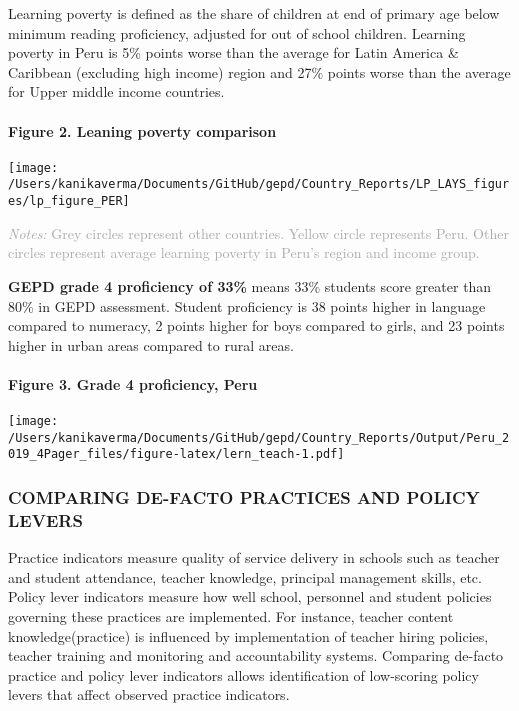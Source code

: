 \documentclass[
  twocolumn]{article}
\begin{document}
Learning poverty is defined as the share of children at end of primary
age below minimum reading proficiency, adjusted for out of school
children. Learning poverty in Peru is 5\% points worse than the average
for Latin America \& Caribbean (excluding high income) region and 27\%
points worse than the average for Upper middle income countries.

\hypertarget{figure-2.-leaning-poverty-comparison}{%
\paragraph{Figure 2. Leaning poverty
comparison}\label{figure-2.-leaning-poverty-comparison}}

\texttt{[image: /Users/kanikaverma/Documents/GitHub/gepd/Country\_Reports/LP\_LAYS\_figures/lp\_figure\_PER]}

{\scriptsize
    \textcolor{darkgray}{\textit{Notes:} Grey circles represent other countries. Yellow circle represents Peru. Other circles represent average learning poverty in Peru's region and income group.}
  }

\textbf{GEPD grade 4 proficiency of 33\%} means 33\% students score
greater than 80\% in GEPD assessment. Student proficiency is 38 points
higher in language compared to numeracy, 2 points higher for boys
compared to girls, and 23 points higher in urban areas compared to rural
areas. \vfill\null

\hypertarget{figure-3.-grade-4-proficiency-peru}{%
\paragraph{Figure 3. Grade 4 proficiency,
Peru}\label{figure-3.-grade-4-proficiency-peru}}

\texttt{[image: /Users/kanikaverma/Documents/GitHub/gepd/Country\_Reports/Output/Peru\_2019\_4Pager\_files/figure-latex/lern\_teach-1.pdf]}

\hypertarget{comparing-de-facto-practices-and-policy-levers}{%
\subsubsection{\texorpdfstring{\textbf{COMPARING DE-FACTO PRACTICES AND
POLICY
LEVERS}}{COMPARING DE-FACTO PRACTICES AND POLICY LEVERS}}\label{comparing-de-facto-practices-and-policy-levers}}

Practice indicators measure quality of service delivery in schools such
as teacher and student attendance, teacher knowledge, principal
management skills, etc. Policy lever indicators measure how well school,
personnel and student policies governing these practices are
implemented. For instance, teacher content knowledge(practice) is
influenced by implementation of teacher hiring policies, teacher
training and monitoring and accountability systems. Comparing de-facto
practice and policy lever indicators allows identification of
low-scoring policy levers that affect observed practice indicators.
\end{document}
